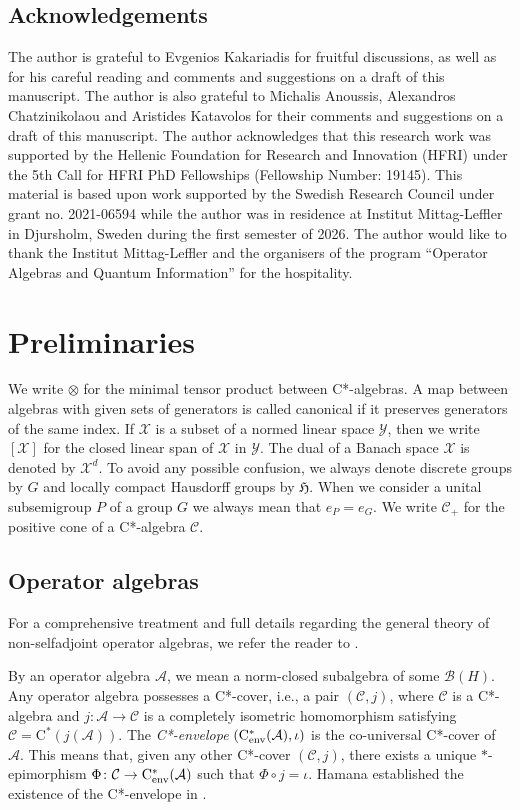 \documentclass[11pt,final]{amsart}
\numberwithin{equation}{section}
\theoremstyle{plain}
\theoremstyle{definition}
\theoremstyle{remark}
\newcommand{\A}{{\mathcal{A}}}
\newcommand{\B}{{\mathcal{B}}}
\newcommand{\C}{{\mathcal{C}}}
\newcommand{\X}{{\mathcal{X}}}
\newcommand{\Y}{{\mathcal{Y}}}
\def\io{\iota}
\newcommand{\fH}{{\mathfrak{H}}}
\newcommand{\ca}{\mathrm{C}^*}
\newcommand{\cenv}{\mathrm{C}^*_{\textup{env}}}
\begin{document}
\subsection{Acknowledgements}
The author is grateful to Evgenios Kakariadis for fruitful discussions, as well as for his careful reading and comments and suggestions on a draft of this manuscript. The author is also grateful to Michalis Anoussis, Alexandros Chatzinikolaou and Aristides Katavolos for their comments and suggestions on a draft of this manuscript.
The author acknowledges that this research work was supported by the Hellenic Foundation for Research and Innovation (HFRI) under the 5th Call for HFRI PhD Fellowships (Fellowship Number: 19145).
This material is based upon work supported by the Swedish Research Council under grant no. 2021-06594 while the author was in residence at Institut Mittag-Leffler in Djursholm, Sweden during the first semester of 2026.
The author would like to thank the Institut Mittag-Leffler and the organisers of the program ``Operator Algebras and Quantum Information'' for the hospitality.

\section{Preliminaries}

We write $\otimes$ for the minimal tensor product between C*-algebras.
A map between algebras with given sets of generators is called canonical if it preserves generators of the same index.
If $\X$ is a subset of a normed linear space $\Y$, then we write $[\X]$ for the closed linear span of $\X$ in $\Y$. The dual of a Banach space $\X$ is denoted by $\X^d$. To avoid any possible confusion, we always denote discrete groups by $G$ and locally compact Hausdorff groups by $\fH$. When we consider a unital subsemigroup $P$ of a group $G$ we always mean that $e_P=e_G$. We write $\C_+$ for the positive cone of a C*-algebra $\C$.

\subsection{Operator algebras}

For a comprehensive treatment and full details regarding the general theory of non-selfadjoint operator algebras, we refer the reader to \cite{BL04, Pau02}. 

By an operator algebra $\A$, we mean a norm-closed subalgebra of some $\B(H)$.
Any operator algebra possesses a C*-cover, i.e., a pair $(\C,j)$, where $\C$ is a C*-algebra and $j \colon \A \to \C$ is a completely isometric homomorphism satisfying $\C = \ca(j(\A))$. 
The \emph{C*-envelope} $(\cenv(\A),\io)$ is the co-universal C*-cover of $\A$. This means that, given any other C*-cover $(\C,j)$, there exists a unique $*$-epimorphism $\Phi \colon \C \to \cenv(\A)$ such that $\Phi \circ j = \io$. 
Hamana established the existence of the C*-envelope in \cite{Ham79}.
\end{document}

